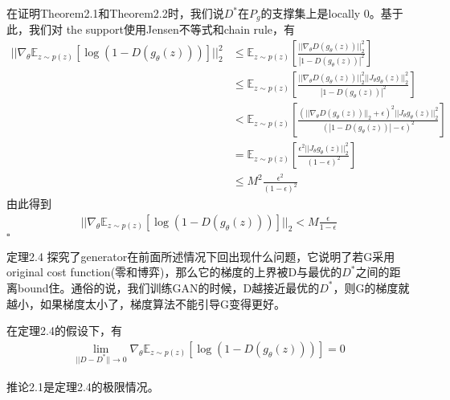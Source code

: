             \begin{Proof}
            在证明Theorem2.1和Theorem2.2时，我们说$D^*$在$P_g$的支撑集上是locally 0。基于此，我们对 the support使用Jensen不等式和chain rule，有
            \begin{align*}
            ||\nabla_\theta \mathbb{E}_{z\sim p(z)}\left[\log(1-D(g_\theta(z)))\right]||_2^2 &\leqslant \mathbb{E}_{z\sim p(z)}\left[ \frac{||\nabla_\theta D(g_\theta(z))||_2^2}{|1-D(g_\theta(z))|^2} \right]\\
            & \leqslant \mathbb{E}_{z\sim p(z)}\left[ \frac{||\nabla_\theta D(g_\theta(z))||_2^2||J_\theta g_\theta(z)||_2^2}{|1-D(g_\theta(z))|^2} \right]\\
            &<\mathbb{E}_{z\sim p(z)}\left[ \frac{(||\nabla_\theta D(g_\theta(z))||_2+\epsilon)^2||J_\theta g_\theta(z)||_2^2}{(|1-D(g_\theta(z))|-\epsilon)^2} \right]\\
            &=\mathbb{E}_{z\sim p(z)} \left[\frac{\epsilon^2||J_{\theta}g_\theta(z)||_2^2}{(1-\epsilon)^2}  \right]\\
            & \leqslant M^2\frac{\epsilon^2}{(1-\epsilon)^2}
            \end{align*}
            由此得到
            \begin{align*}
            ||\nabla_\theta \mathbb{E}_{z\sim p(z)}\left[\log(1-D(g_\theta(z)))\right]||_2 <M\frac{\epsilon}{1-\epsilon}
            \end{align*}
            $\square$
            \end{Proof}
            \par
            定理2.4 探究了generator在前面所述情况下回出现什么问题，它说明了若G采用original cost function(零和博弈)，那么它的梯度的上界被D与最优的$D^*$之间的距离bound住。通俗的说，我们训练GAN的时候，D越接近最优的$D^*$，则G的梯度就越小，如果梯度太小了，梯度算法不能引导G变得更好。
            \begin{corollary}[corollary 2.1]
            在定理2.4的假设下，有
            \begin{align*}
            \lim_{||D-D^*||\to 0}\nabla_\theta \mathbb{E}_{z\sim p(z)}[\log (1-D(g_\theta(z)))]=0
            \end{align*}
            \end{corollary}
            推论2.1是定理2.4的极限情况。

